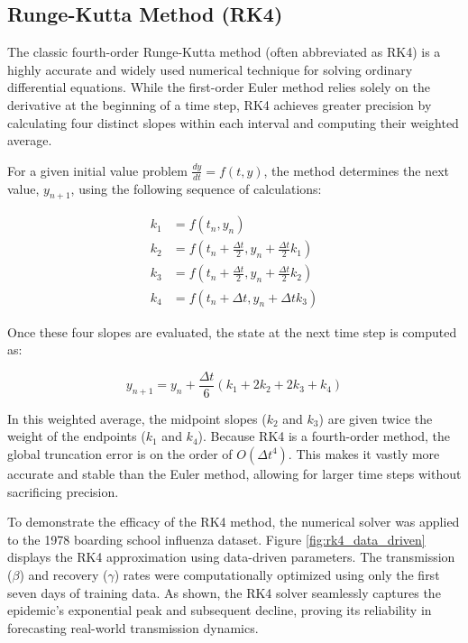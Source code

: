 \documentclass[12pt,a4paper]{article}
\begin{document}
\subsection{Runge-Kutta Method (RK4)}

The classic fourth-order Runge-Kutta method (often abbreviated as RK4) is a highly accurate and widely used numerical technique for solving ordinary differential equations. While the first-order Euler method relies solely on the derivative at the beginning of a time step, RK4 achieves greater precision by calculating four distinct slopes within each interval and computing their weighted average.

For a given initial value problem $\frac{dy}{dt} = f(t, y)$, the method determines the next value, $y_{n+1}$, using the following sequence of calculations:

\begin{align}
    k_1 &= f(t_n, y_n) \label{eq:rk4_k1} \\
    k_2 &= f\left(t_n + \frac{\Delta t}{2}, y_n + \frac{\Delta t}{2} k_1\right) \label{eq:rk4_k2} \\
    k_3 &= f\left(t_n + \frac{\Delta t}{2}, y_n + \frac{\Delta t}{2} k_2\right) \label{eq:rk4_k3} \\
    k_4 &= f(t_n + \Delta t, y_n + \Delta t k_3) \label{eq:rk4_k4}
\end{align}

Once these four slopes are evaluated, the state at the next time step is computed as:

\begin{equation}
    y_{n+1} = y_n + \frac{\Delta t}{6} (k_1 + 2k_2 + 2k_3 + k_4) \label{eq:rk4_final}
\end{equation}

In this weighted average, the midpoint slopes ($k_2$ and $k_3$) are given twice the weight of the endpoints ($k_1$ and $k_4$). Because RK4 is a fourth-order method, the global truncation error is on the order of $O(\Delta t^4)$. This makes it vastly more accurate and stable than the Euler method, allowing for larger time steps without sacrificing precision.

\vspace{1em}

To demonstrate the efficacy of the RK4 method, the numerical solver was applied to the 1978 boarding school influenza dataset. Figure \ref{fig:rk4_data_driven} displays the RK4 approximation using data-driven parameters. The transmission ($\beta$) and recovery ($\gamma$) rates were computationally optimized using only the first seven days of training data. As shown, the RK4 solver seamlessly captures the epidemic's exponential peak and subsequent decline, proving its reliability in forecasting real-world transmission dynamics.
\end{document}
